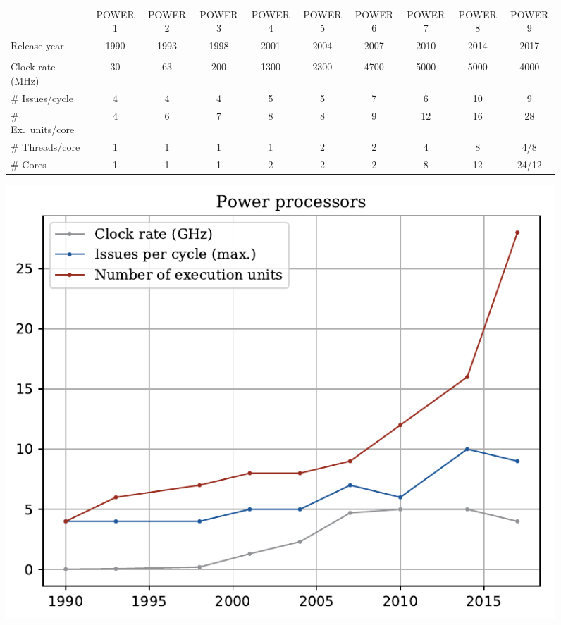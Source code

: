 \documentclass[12pt,a4paper]{article} %
\begin{document}
\begin{figure} [htb!]
	\small  \sffamily
	\hfill \break
	\begin{tabularx} {\textwidth} {l C C C C C C C C C}
							& {\scriptsize \ttfamily POWER1}
							& {\scriptsize \ttfamily POWER2}
							& {\scriptsize \ttfamily POWER3}
							& {\scriptsize \ttfamily POWER4}
							& {\scriptsize \ttfamily POWER5}
							& {\scriptsize \ttfamily POWER6}
							& {\scriptsize \ttfamily POWER7}
							& {\scriptsize \ttfamily POWER8}
							& {\scriptsize \ttfamily POWER9} \\
		{\normalfont Release year} 		
							& 1990
							& 1993
							& 1998
							& 2001 
							& 2004
							& 2007
							& 2010
							& 2014
							& 2017\\
							&&&&&&&&&\\
		{\normalfont Clock rate (MHz)}	
							& 30 	%
							& 63 	%
							& 200 	%
							& 1300 	%
							& 2300	%
							& 4700  %
							& 5000  %
							& 5000  %
							& 4000  \\%
		{\normalfont \# Issues/cycle}
							& 4
							& 4 
							& 4
							& 5
							& 5
							& 7
							& 6
							& 10
							& 9\\
		{\normalfont \# Ex.~units/core}
						  	& 4
							& 6 
							& 7
							& 8
							& 8
							& 9
							& 12
							& 16
							& 28 \\
		{\normalfont \# Threads/core}
							& 1
							& 1 
							& 1
							& 1
							& 2
							& 2
							& 4
							& 8
							& 4/8\\
		{\normalfont \# Cores}
							& 1
							& 1
							& 1 
							& 2
							& 2
							& 2
							& 8
							& 12
							& 24/12\\
	\end{tabularx}
	\hfill \break
	\includegraphics[width=\textwidth]{Source/POWER.pdf}
	

\end{figure}
\end{document}
